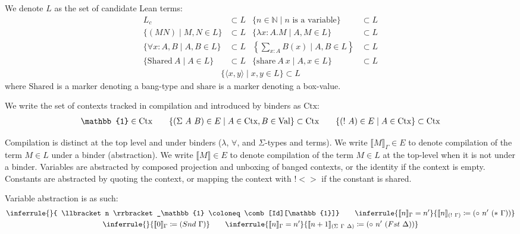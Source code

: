 \documentclass{lmcs}
\newcommand{\shared}{\text{Shared}}
\newcommand{\share}{\text{share}}
\newcommand{\val}{\text{Val}}
\newcommand{\ctx}{\text{Ctx}}
\newcommand{\llb}{\llbracket}
\newcommand{\rrb}{\rrbracket}
\begin{document}
\begin{defi}
  We denote \(L\) as the set of candidate Lean terms:
  \[
    \begin{aligned}
      L_c &\subset L & \{ n \in \mathbb{N} \mid \text{\(n\) is a variable}\} &\subset L\\
      \{ (M N) \mid M, N \in L \} &\subset L & \{ \lambda x : A.M \mid A, M \in L \} &\subset L\\
      \{ \forall x : A,B \mid A, B \in L\} &\subset L & \left\{ \sum_{x : A} B(x) \mid A, B \in L \right\} &\subset L\\
      \{ \shared\ A \mid A \in L \} &\subset L & \{ \share\ A\ x \mid A, x \in L \} &\subset L
    \end{aligned}
  \]
  \[
    \begin{gathered}
      \{ \langle x, y \rangle \mid x, y \in L\} \subset L
    \end{gathered}
  \]
  where \(\shared\) is a marker denoting a bang-type and \(\share\) is a marker denoting a box-value.
\end{defi}

\begin{defi}
  We write the set of contexts tracked in compilation and introduced by binders as \(\ctx\):
  \[
    \begin{gathered}
      \mathbb{1} \in \ctx \qquad \{ \comb[\Sigma][A][B] \in E \mid A \in \ctx, B \in \val\} \subset \ctx \qquad \{ \comb[!][A] \in E \mid A \in \ctx\} \subset \ctx
    \end{gathered}
  \]
\end{defi}

Compilation is distinct at the top level and under binders (\(\lambda\), \(\forall\), and \(\Sigma\)-types and terms). We write \(\llb M \rrb_\Gamma \in E\) to denote compilation of the term \(M \in L\) under a binder (abstraction). We write \(\llb M \rrb \in E\) to denote compilation of the term \(M \in L\) at the top-level when it is not under a binder. Variables are abstracted by composed projection and unboxing of banged contexts, or the identity if the context is empty. Constants are abstracted by quoting the context, or mapping the context with \(!<>\) if the constant is shared.

\begin{defi}
  Variable abstraction is as such:
  \[
    \begin{gathered}
      \inferrule
      { }
      { \llb n \rrb_\mathbb{1} \coloneq \comb[Id][\mathbb{1}]} \qquad
      \inferrule
      { \llb n \rrb_\Gamma = n'}
      { \llb n \rrb_{\comb[!][\Gamma]} \coloneq \comb[\circ][n'][\comb[*][\Gamma]]}\\
      \inferrule
      { }
      { \llb 0 \rrb_\Gamma \coloneq \comb[Snd][\Gamma]} \qquad
      \inferrule
      { \llb n \rrb_\Gamma = n'}
      { \llb n + 1 \rrb_{\comb[\Sigma][\Gamma][\Delta]} \coloneq \comb[\circ][n'][\comb[Fst][\Delta]]}                                                    
    \end{gathered}
  \]
\end{defi}
\end{document}
